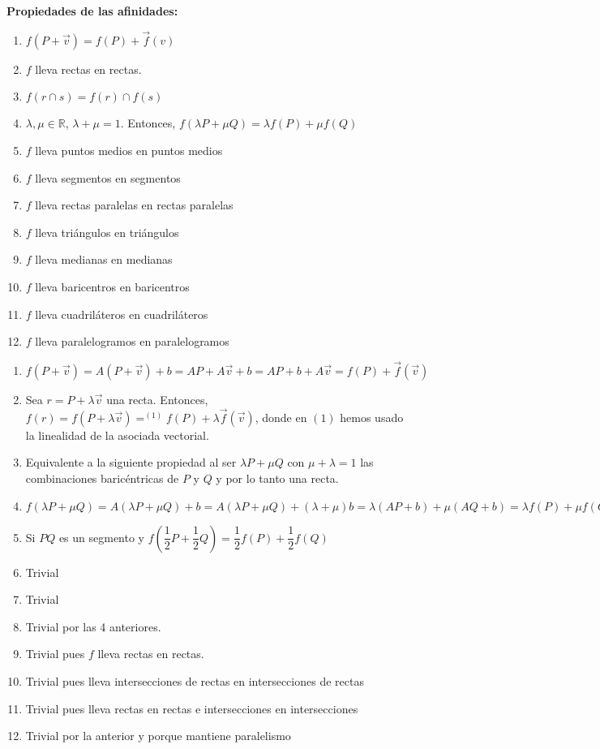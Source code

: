 \documentclass[11pt, a4paper]{article}
\makeatletter
\newif\IfInSansMode
\let\oldsf\sffamily
\renewcommand*{\sffamily}{\oldsf\mathversion{sans}\InSansModetrue}
\let\oldnorm\normalfont
\renewcommand*{\normalfont}{\oldnorm\InSansModefalse\mathversion{normal}}
\renewenvironment{proof}[1][\proofname] {\vspace{-15pt}\par\pushQED{\qed}\normalfont\topsep6\p@\@plus6\p@\relax\trivlist\item[\hskip\labelsep\it#1\@addpunct{.}]\ignorespaces}{\popQED\endtrivlist\@endpefalse}
\newcommand{\R}{\mathbb{R}}
\renewcommand{\vec}{\overrightarrow}
\renewenvironment{proof}[1][\proofname] {\par\pushQED{\qed}\normalfont\topsep6\p@\@plus6\p@\relax\trivlist\item[\hskip\labelsep\itshape\sffamily#1\@addpunct{.}]\ignorespaces}{\popQED\endtrivlist\@endpefalse}
\theoremstyle{theorem-style}
\theoremstyle{definition-style}
\theoremstyle{remark-style}
\theoremstyle{example-style}
\makeatother
\begin{document}
\textbf{Propiedades de las afinidades:}\\
\begin{enumerate}
\item $f(P + \vec{v}) = f(P) + \vec{f}(v)$
\item $f$ lleva rectas en rectas.
\item $f(r\cap s) = f(r) \cap f(s)$
\item $\lambda,\mu \in \R$, $\lambda+\mu=1$. Entonces, $f(\lambda P + \mu Q) = \lambda f(P) +  \mu f(Q)$
\item $f$ lleva puntos medios en puntos medios
\item $f$ lleva segmentos en segmentos
\item $f$ lleva rectas paralelas en rectas paralelas
\item $f$ lleva triángulos en triángulos
\item $f$ lleva medianas en medianas
\item $f$ lleva baricentros en baricentros
\item $f$ lleva cuadriláteros en cuadriláteros
\item $f$ lleva paralelogramos en paralelogramos
\end{enumerate}
\begin{proof}\hfill
  \begin{enumerate}
  \item $f(P+\vec{v}) = A(P+\vec{v}) + b = AP + A\vec{v} + b = AP + b + A\vec{v} = f(P) + \vec{f}(\vec{v})$
  \item Sea $r = P + \lambda \vec{v}$ una recta. Entonces, $f(r) = f(P + \lambda \vec{v}) =^{(1)} f(P) + \lambda \vec{f}(\vec{v})$, donde en $(1)$ hemos usado la linealidad de la asociada vectorial.
  \item Equivalente a la siguiente propiedad al ser $\lambda P + \mu Q$ con $\mu+\lambda = 1$ las combinaciones baricéntricas de $P$ y $Q$ y por lo tanto una recta.
  \item $f(\lambda P + \mu Q) = A(\lambda P + \mu Q) + b =A(\lambda P + \mu Q) + (\lambda + \mu)b = \lambda (AP + b) + \mu (AQ + b) = \lambda f(P) + \mu f(Q)  $
  \item Si $PQ$ es un segmento y $f(\dfrac{1}{2}P + \dfrac{1}{2}Q) = \dfrac{1}{2}f(P) +  \dfrac{1}{2}f(Q)$
  \item Trivial
  \item Trivial
  \item Trivial por las 4 anteriores.
  \item Trivial pues $f$ lleva rectas en rectas.
  \item Trivial pues lleva intersecciones de rectas en intersecciones de rectas
  \item Trivial pues lleva rectas en rectas e intersecciones en intersecciones
  \item Trivial por la anterior y porque mantiene paralelismo

    
  \end{enumerate}
\end{proof}
\end{document}
